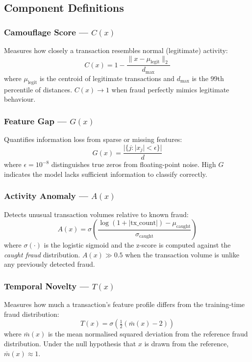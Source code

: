 \documentclass[journal]{IEEEtran}
\begin{document}
\subsection{Component Definitions}
\label{ssec:components}

\subsubsection{Camouflage Score --- $C(x)$}
Measures how closely a transaction resembles normal (legitimate) activity:
\begin{equation}
  C(x) = 1 - \frac{\|x - \mu_{\text{legit}}\|_2}{d_{\max}}
  \label{eq:camouflage}
\end{equation}
where $\mu_{\text{legit}}$ is the centroid of legitimate transactions and $d_{\max}$ is the 99th percentile of distances. $C(x) \to 1$ when fraud perfectly mimics legitimate behaviour.

\subsubsection{Feature Gap --- $G(x)$}
Quantifies information loss from sparse or missing features:
\begin{equation}
  G(x) = \frac{|\{j : |x_j| < \epsilon\}|}{d}
  \label{eq:feature_gap}
\end{equation}
where $\epsilon = 10^{-8}$ distinguishes true zeros from floating-point noise. High $G$ indicates the model lacks sufficient information to classify correctly.

\subsubsection{Activity Anomaly --- $A(x)$}
Detects unusual transaction volumes relative to known fraud:
\begin{equation}
  A(x) = \sigma\!\left(\frac{\log(1 + |\text{tx\_count}|) - \mu_{\text{caught}}}{\sigma_{\text{caught}}}\right)
  \label{eq:activity}
\end{equation}
where $\sigma(\cdot)$ is the logistic sigmoid and the z-score is computed against the \textit{caught fraud} distribution. $A(x) \gg 0.5$ when the transaction volume is unlike any previously detected fraud.

\subsubsection{Temporal Novelty --- $T(x)$}
Measures how much a transaction's feature profile differs from the training-time fraud distribution:
\begin{equation}
  T(x) = \sigma\!\left(\tfrac{1}{2}(\bar{m}(x) - 2)\right)
  \label{eq:temporal}
\end{equation}
where $\bar{m}(x)$ is the mean normalised squared deviation from the reference fraud distribution. Under the null hypothesis that $x$ is drawn from the reference, $\bar{m}(x) \approx 1$.
\end{document}
